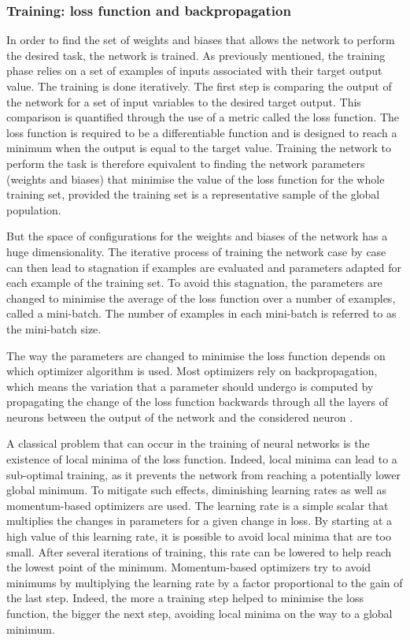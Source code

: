 \subsubsection{Training: loss function and backpropagation}

In order to find the set of weights and biases that allows the network to perform the desired task, the network is trained.
As previously mentioned, the training phase relies on a set of examples of inputs associated with their target output value. The training is done iteratively. The first step is comparing the output of the network for a set of input variables to the desired target output. This comparison is quantified through the use of a metric called the loss function. The loss function is required to be a differentiable function and is designed to reach a minimum when the output is equal to the target value. Training the network to perform the task is therefore equivalent to finding the network parameters (weights and biases) that minimise the value of the loss function for the whole training set, provided the training set is a representative sample of the global population.

But the space of configurations for the weights and biases of the network has a huge dimensionality. The iterative process of training the network case by case can then lead to stagnation if examples are evaluated and parameters adapted for each example of the training set. To avoid this stagnation, the parameters are changed to minimise the average of the loss function over a number of examples, called a mini-batch. The number of examples in each mini-batch is referred to as the mini-batch size.

The way the parameters are changed to minimise the loss function depends on which optimizer algorithm is used. Most optimizers rely on backpropagation, which means the variation that a parameter should undergo is computed by propagating the change of the loss function backwards through all the layers of neurons between the output of the network and the considered neuron \cite{1986Natur.323..533R}.


A classical problem that can occur in the training of neural networks is the existence of local minima of the loss function. Indeed, local minima can lead to a sub-optimal training, as it prevents the network from reaching a potentially lower global minimum. To mitigate such effects, diminishing learning rates as well as momentum-based optimizers are used. The learning rate is a simple scalar that multiplies the changes in parameters for a given change in loss. By starting at a high value of this learning rate, it is possible to avoid local minima that are too small. After several iterations of training, this rate can be lowered to help reach the lowest point of the minimum. Momentum-based optimizers try to avoid minimums by multiplying the learning rate by a factor proportional to the gain of the last step. Indeed, the more a training step helped to minimise the loss function, the bigger the next step, avoiding local minima on the way to a global minimum.

